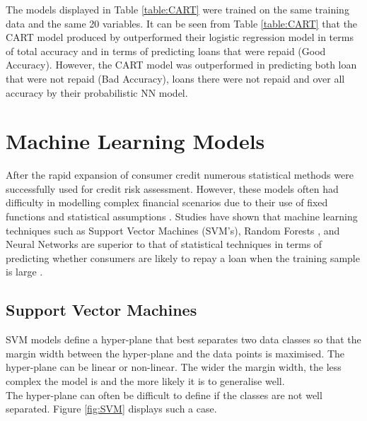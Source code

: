 \vspace{15pt}

The models displayed in Table \ref{table:CART} were trained on the same training data and the same 20 variables. It can be seen from Table \ref{table:CART} that the CART model produced by \textcite{DecTreesZekic} outperformed their logistic regression model in terms of total accuracy and in terms of predicting loans that were repaid (Good Accuracy). However, the CART model was outperformed in predicting both loan that were not repaid (Bad Accuracy), loans there were not repaid and over all accuracy by their probabilistic NN model.  

\section{Machine Learning Models}

After the rapid expansion of consumer credit numerous statistical methods were successfully used for credit risk assessment. However, these models often had difficulty in modelling complex financial scenarios due to their use of fixed functions and statistical assumptions \parencite{AICredDefSwap}. Studies have shown that machine learning techniques such as Support Vector Machines (SVM's), Random Forests , and Neural Networks are superior to that of statistical techniques in terms of predicting whether consumers are likely to repay a loan when the training sample is large \parencite{SVMCrook}. 


\subsection{Support Vector Machines}

SVM models define a hyper-plane that best separates two data classes so that the margin width between the hyper-plane and
the data points is maximised. The hyper-plane can be linear or non-linear. The wider the  margin width, the less complex the model is and the more likely it is to generalise well. \\


The hyper-plane can often be difficult to define if the classes are not well separated. Figure \ref{fig:SVM} displays such a case. \newpage

\vspace{15pt}

